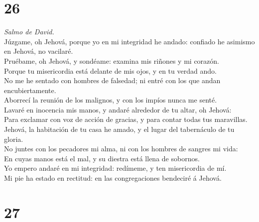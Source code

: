 \hypertarget{section-25}{%
\section{26}\label{section-25}}

 \emph{Salmo de David.}\\
Júzgame, oh Jehová, porque yo en mi integridad he andado: confiado he
asimismo en Jehová, no vacilaré.\\
 Pruébame, oh Jehová, y sondéame: examina mis riñones y mi
corazón.\\
 Porque tu misericordia está delante de mis ojos, y en tu
verdad ando.\\
 No me he sentado con hombres de falsedad; ni entré con los
que andan encubiertamente.\\
 Aborrecí la reunión de los malignos, y con los impíos nunca
me senté.\\
 Lavaré en inocencia mis manos, y andaré alrededor de tu
altar, oh Jehová:\\
 Para exclamar con voz de acción de gracias, y para contar
todas tus maravillas.\\
 Jehová, la habitación de tu casa he amado, y el lugar del
tabernáculo de tu gloria.\\
 No juntes con los pecadores mi alma, ni con los hombres de
sangres mi vida:\\
 En cuyas manos está el mal, y su diestra está llena de
sobornos.\\
 Yo empero andaré en mi integridad: redímeme, y ten
misericordia de mí.\\
 Mi pie ha estado en rectitud: en las congregaciones
bendeciré á Jehová.

\hypertarget{section-26}{%
\section{27}\label{section-26}}

